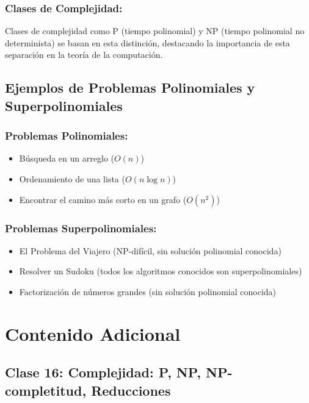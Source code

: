 \documentclass[letter, 12pt]{article}
\begin{document}
    \subsubsection{Clases de Complejidad:}
    Clases de complejidad como P (tiempo polinomial) y NP (tiempo polinomial no determinista) se basan en esta distinción, destacando la importancia de esta separación en la teoría de la computación.

	\subsection{Ejemplos de Problemas Polinomiales y Superpolinomiales}

    \subsubsection{Problemas Polinomiales:}
    \begin{itemize}
        \item Búsqueda en un arreglo ($O(n)$)
        \item Ordenamiento de una lista ($O(n \log n)$)
        \item Encontrar el camino más corto en un grafo ($O(n^2)$)
    \end{itemize}

    \subsubsection{Problemas Superpolinomiales:}
    \begin{itemize}
        \item El Problema del Viajero (NP-difícil, sin solución polinomial conocida)
        \item Resolver un Sudoku (todos los algoritmos conocidos son superpolinomiales)
        \item Factorización de números grandes (sin solución polinomial conocida)
    \end{itemize}

	\section{Contenido Adicional}

    \subsection{Clase 16: Complejidad: P, NP, NP-completitud, Reducciones \cite{demaine2015complexity}}
\end{document}

